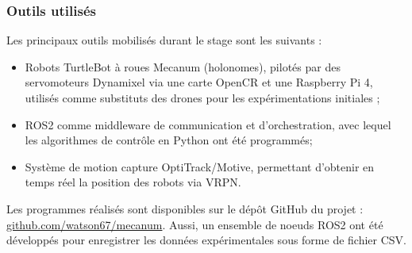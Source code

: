 \subsubsection{Outils utilisés}

Les principaux outils mobilisés durant le stage sont les suivants :
\begin{itemize}
\item Robots TurtleBot à roues Mecanum (holonomes), pilotés par des servomoteurs Dynamixel via une carte OpenCR et une Raspberry Pi 4, utilisés comme substituts des drones pour les expérimentations initiales ;
\item ROS2 comme middleware de communication et d’orchestration, avec lequel les algorithmes de contrôle en Python ont été programmés;
\item Système de motion capture OptiTrack/Motive, permettant d'obtenir en temps réel la position des robots via VRPN.
\end{itemize}
Les programmes réalisés sont disponibles sur le dépôt GitHub du projet :
\href{https://github.com/watson67/mecanum}{github.com/watson67/mecanum}.
Aussi, un ensemble de noeuds ROS2 ont été développés pour enregistrer les données expérimentales sous forme de fichier CSV.
